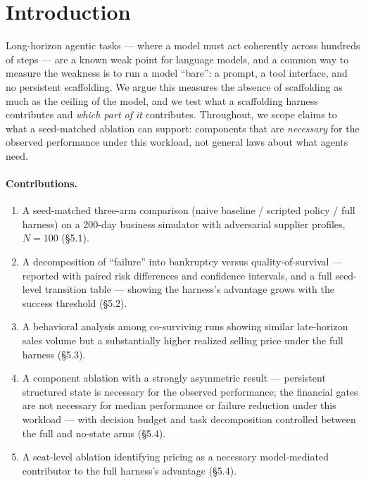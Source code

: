 \documentclass[11pt]{article}
\begin{document}
\section{Introduction}

Long-horizon agentic tasks --- where a model must act coherently across
hundreds of steps --- are a known weak point for language models, and a common
way to measure the weakness is to run a model ``bare'': a prompt, a tool
interface, and no persistent scaffolding. We argue this measures the absence of
scaffolding as much as the ceiling of the model, and we test what a scaffolding
harness contributes and \emph{which part of it} contributes. Throughout, we
scope claims to what a seed-matched ablation can support: components that are
\emph{necessary} for the observed performance under this workload, not general
laws about what agents need.

\paragraph{Contributions.}
\begin{enumerate}
\item A seed-matched three-arm comparison (naive baseline / scripted policy /
full harness) on a 200-day business simulator with adversarial supplier
profiles, $N=100$ (\S5.1).
\item A decomposition of ``failure'' into bankruptcy versus quality-of-survival
--- reported with paired risk differences and confidence intervals, and a full
seed-level transition table --- showing the harness's advantage grows with the
success threshold (\S5.2).
\item A behavioral analysis among co-surviving runs showing similar
late-horizon sales volume but a substantially higher realized selling price
under the full harness (\S5.3).
\item A component ablation with a strongly asymmetric result --- persistent
structured state is necessary for the observed performance; the financial gates
are not necessary for median performance or failure reduction under this
workload --- with decision budget and task decomposition controlled between the
full and no-state arms (\S5.4).
\item A seat-level ablation identifying pricing as a necessary model-mediated
contributor to the full harness's advantage (\S5.4).
\end{enumerate}
\end{document}
